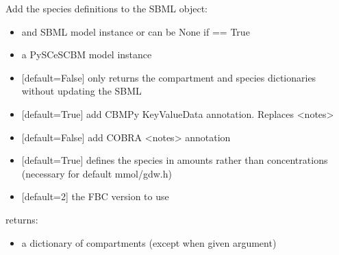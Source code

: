 \documentclass[letterpaper,10pt,english]{sphinxmanual}
\begin{document}
\begin{fulllineitems}
\label{\detokenize{modules_doc:cbmpy.CBXML.sbml_setSpeciesL3}}
\pysigstartsignatures
{}
\pysigstopsignatures
\sphinxAtStartPar
Add the species definitions to the SBML object:
\begin{itemize}
\item {} 
\sphinxAtStartPar
{} and SBML model instance or can be None if  == True

\item {} 
\sphinxAtStartPar
{} a PySCeSCBM model instance

\item {} 
\sphinxAtStartPar
{} {[}default=False{]} only returns the compartment and species dictionaries without updating the SBML

\item {} 
\sphinxAtStartPar
{} {[}default=True{]} add CBMPy KeyValueData annotation. Replaces \textless{}notes\textgreater{}

\item {} 
\sphinxAtStartPar
{} {[}default=False{]} add COBRA \textless{}notes\textgreater{} annotation

\item {} 
\sphinxAtStartPar
{} {[}default=True{]} defines the species in amounts rather than concentrations (necessary for default mmol/gdw.h)

\item {} 
\sphinxAtStartPar
{} {[}default=2{]} the FBC version to use

\end{itemize}

\sphinxAtStartPar
returns:
\begin{itemize}
\item {} 
\sphinxAtStartPar
{} a dictionary of compartments (except when given  argument)

\end{itemize}

\end{fulllineitems}
\end{document}
